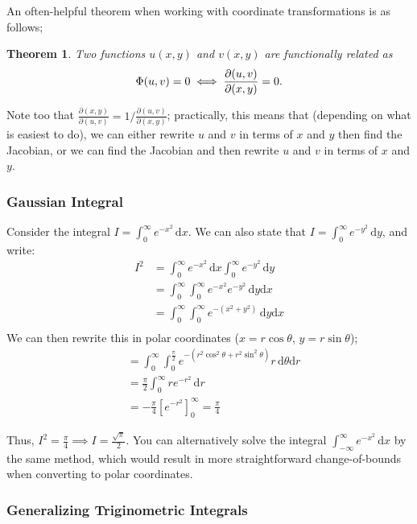 \documentclass[12pt]{article}
\newtheorem*{theorem}{Theorem}
\begin{document}
{An often-helpful theorem when working with coordinate transformations is as follows;
\begin{theorem}
    Two functions $u(x,y)$ and $v(x,y)$ are functionally related as \[\Phi(u, v) = 0 \iff \frac{\partial (u,v)}{\partial (x,y)} = 0.\]
\end{theorem}

Note too that $\frac{\partial(x,y)}{\partial(u,v)} = 1/\frac{\partial(u,v)}{\partial(x,y)}$; practically, this means that (depending on what is easiest to do), we can either rewrite $u$ and $v$ in terms of $x$ and $y$ then find the Jacobian, or we can find the Jacobian and then rewrite $u$ and $v$ in terms of $x$ and $y$.
\subsubsection{Gaussian Integral}

Consider the integral $I = \int_0^{\infty} e^{-x^2} \,\text{d}x$. We can also state that $I = \int_{0}^{\infty} e^{-y^2} \,\text{d}y$, and write: \begin{align*}
    I^2 &= \int_{0}^{\infty} e^{-x^2} \, \text{d}x \int_{0}^{\infty} e^{-y^2} \,\text{d}y\\
    &= \int_{0}^{\infty}\int_{0}^{\infty} e^{-x^2} e^{-y^2} \, \text{d}y\text{d}x\\
    &= \int_{0}^{\infty}\int_{0}^{\infty} e^{-(x^2+y^2)}\, \text{d}y\text{d}x\\
\end{align*}
We can then rewrite this in polar coordinates ($x = r\cos \theta$, $y = r\sin\theta$);
\begin{align*}
    &= \int_{0}^{\infty}\int_{0}^{\frac{\pi}{2}} e^{-(r^2\cos^2 \theta+r^2\sin^2\theta)} r\, \text{d}\theta\text{d}r\\
    &= \frac{\pi}{2} \int_{0}^{\infty}r e^{-r^2} \,\text{d}r\\
    &= -\frac{\pi}{4}\left[e^{-r^2}\right]_0^{\infty} = \frac{\pi}{4}
\end{align*}

Thus, $I^2 = \frac{\pi}{4} \implies I = \frac{\sqrt{\pi}}{2}.$ You can alternatively solve the integral $\int_{-\infty}^{\infty} e^{-x^2}\,\text{d}x$ by the same method, which would result in more straightforward change-of-bounds when converting to polar coordinates.

\subsubsection{Generalizing Triginometric Integrals}\label{sec:generalizing_trig_integrals}

}
\end{document}
